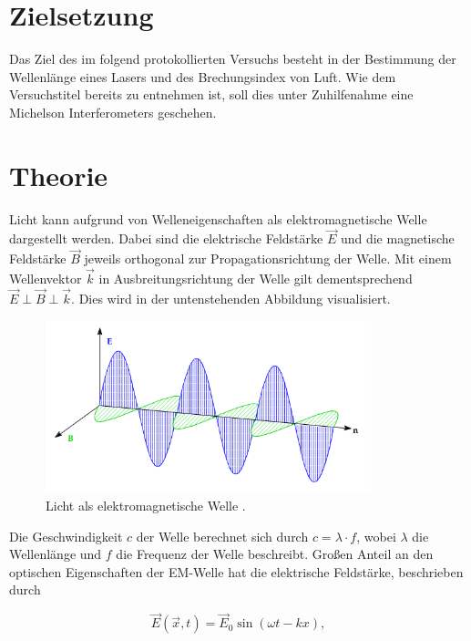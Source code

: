 
\usepackage{wrapfig}



\section{Zielsetzung}
\label{Zielsetzung}

\noindent Das Ziel des im folgend protokollierten Versuchs besteht in der Bestimmung der Wellenlänge eines Lasers und des 
Brechungsindex von Luft. Wie dem Versuchstitel bereits zu entnehmen ist, soll dies unter Zuhilfenahme eine Michelson 
Interferometers geschehen.

\section{Theorie}
\label{sec:Theorie}

Licht kann aufgrund von Welleneigenschaften als elektromagnetische Welle dargestellt werden. Dabei sind die elektrische 
Feldstärke $\vec{E}$ und die magnetische Feldstärke $\vec{B}$ jeweils orthogonal zur Propagationsrichtung der Welle. Mit einem 
Wellenvektor $\vec{k}$ in Ausbreitungsrichtung der Welle gilt dementsprechend $\vec{E} \perp \vec{B} \perp \vec{k}$. Dies wird in 
der untenstehenden Abbildung visualisiert.

\begin{figure}
    \centering
    \includegraphics[height=5cm]{EM_Welle.png}
    \caption{Licht als elektromagnetische Welle \cite{Versuchsanleitung_v401}.}
    \label{fig:EMWelle}
\end{figure}

\noindent Die Geschwindigkeit $c$ der Welle berechnet sich durch $c = \lambda\cdot{}f$, wobei $\lambda$ die Wellenlänge und $f$ die Frequenz 
der Welle beschreibt. Großen Anteil an den optischen Eigenschaften der EM-Welle hat die elektrische Feldstärke, beschrieben durch 

\begin{equation*}
    \vec{E}\left(\vec{x},t\right) = \vec{E}_0\sin\left(\omega{}t - kx\right),
\end{equation*}

